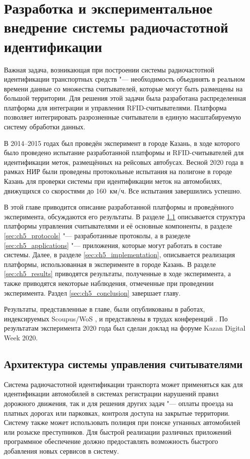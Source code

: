 \chapter{Разработка и экспериментальное внедрение системы радиочастотной идентификации}\label{ch:ch5}
Важная задача, возникающая при построении системы радиочастотной идентификации транспортных средств "--- необходимость объединять в реальном времени данные со множества считывателей, которые могут быть размещены на большой территории. Для решения этой задачи была разработана распределенная платформа для интеграции и управления RFID-считывателями. Платформа позволяет интегрировать разрозненные считыватели в единую масштабируемую систему обработки данных.

В 2014--2015 годах был проведён эксперимент в городе Казань, в ходе которого было проведено испытание разработанной платформы и RFID-считывателей для идентификации меток, размещённых на рейсовых автобусах. Весной 2020 года в рамках НИР были проведены протокольные испытания на полигоне в городе Казань для проверки системы при идентификации меток на автомобилях, движущихся со скоростями до 160~км/ч. Все испытания завершились успешно.

В этой главе приводится описание разработанной платформы и проведённого эксперимента, обсуждаются его результаты. В разделе \ref{sec:ch5_architecture} описывается структура платформы управления считывателями и её основные компоненты, в разделе \ref{sec:ch5_protocols} "--- разработанные протоколы, а в разеделе \ref{sec:ch5_applications} "--- приложения, которые могут работать в составе системы. Далее, в разделе \ref{sec:ch5_implementation}, описывается реализация платформы, использованная в эксперименте в городе Казань. В разделе \ref{sec:ch5_results} приводятся результаты, полученные в ходе эксперимента, а также приводятся некоторые наблюдения, отмеченные при проведении эксперимента. Раздел \ref{sec:ch5_conclusion} завершает главу.

Результаты, представленные в главе, были опубликованы в работах, индексируемых Scoupus/WoS \cite{RFIDCTRL_NETS2CARS2014, RFIDTA2012}, и представлены в трудах конференций \cite{RFIDCTRL_DCCN2017, RFIDCTRL_VSPU2014}. По результатам эксперимента 2020 года был сделан доклад на форуме Kazan Digital Week 2020.


\section{Архитектура системы управления считывателями}\label{sec:ch5_architecture}
Система радиочастотной идентификации транспорта может применяться как для идентификации автомобилей в системах регистрации нарушений правил дорожного движения, так и для решения других задач "--- оплаты проезда на платных дорогах или парковках, контроля доступа на закрытые территории. Систему также может использовать полиция при поиске угнанных автомобилей или розыске преступников. Для быстрой реализации различных приложений программное обеспечение должно предоставлять возможность быстрого добавления новых сервисов в систему.



